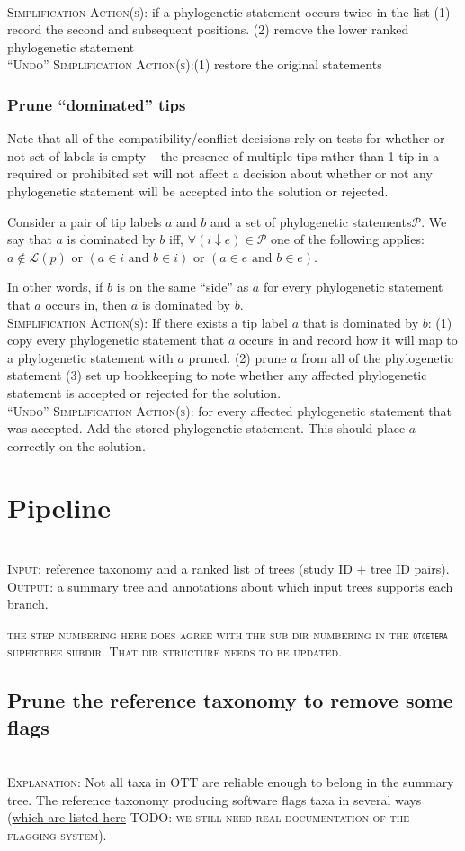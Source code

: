 \documentclass[11pt]{article}
\newcommand{\ps}{phylogenetic statement\xspace}
\newcommand{\pss}{phylogenetic statements\xspace}
\newcommand{\otc}[0]{\texttt{otcetera}\xspace}
\newcommand{\simplification}[0]{\\\noindent\textsc{Simplification Action(s)}:\xspace}
\newcommand{\undoActions}[0]{\\\noindent\textsc{``Undo'' Simplification Action(s)}:\xspace}
\newcommand{\stepExplanation}[0]{\\\noindent\textsc{Explanation}:\xspace}
\newcommand{\stepInput}[0]{\\\noindent\textsc{Input}:\xspace}
\newcommand{\stepOutput}[0]{\\\noindent\textsc{Output}:\xspace}
\newcommand{\comment}[1]{{\color{red} \textsc{#1}}\xspace}
\newcommand{\TODO}[1]{\comment{TODO: #1}}
\newcommand{\leafLabels}[1]{\ensuremath{\mathcal{L}(#1)}}
\newcommand{\vvps}[2]{\ensuremath{{#1}\downarrow{#2}}}
\begin{document}
\simplification if a \ps occurs twice in the list (1) record the second and subsequent positions. (2) remove the lower ranked \ps
\undoActions (1) restore the original statements

\subsubsection{Prune ``dominated'' tips}
Note that all of the compatibility/conflict decisions rely on tests for whether or not
    set of labels is empty -- the presence of multiple tips rather than 1 tip in a
    required or prohibited set will not affect a decision about whether or not any
    \ps will be accepted into the solution or rejected.

Consider a pair of tip labels $a$ and $b$ and a set of \pss $\mathcal{P}$.
We say that $a$ is dominated by $b$ iff, $\forall (\vvps{i}{e}) \in \mathcal{P}$ one of the 
    following applies:
    $a\notin \leafLabels{p}$
    or $(a \in i \mbox{ and } b \in i)$
    or $(a \in e \mbox{ and } b \in e)$.

In other words, if $b$ is on the same ``side'' as $a$ for every \ps that $a$ occurs in, then
 $a$ is dominated by $b$.
 \simplification  If there exists a tip label $a$ that is dominated by $b$:
    (1) copy every \ps that $a$ occurs in and record how it will map to a \ps with $a$ pruned.
    (2) prune $a$ from all of the \ps
    (3) set up bookkeeping to note whether any affected \ps is accepted or rejected for the solution.
\undoActions for every affected \ps that was accepted. Add the stored \ps. This should place $a$ correctly on the solution.


\section{Pipeline}
\stepInput reference taxonomy and a ranked list of trees (study ID + tree ID pairs).
\stepOutput a summary tree and annotations about which input trees supports each branch.

\comment{the step numbering here does  agree with the sub dir numbering in
    the \otc supertree subdir. That dir structure needs to be updated.}

\subsection{Prune the reference taxonomy to remove some flags}
\stepExplanation Not all taxa in OTT are reliable enough to belong in the 
    summary tree.
The reference taxonomy producing software flags taxa in several ways 
(\href{https://github.com/OpenTreeOfLife/reference-taxonomy/wiki/taxon-flags}{which are listed here}
\TODO{we still need real documentation of the flagging system}).
\end{document}
